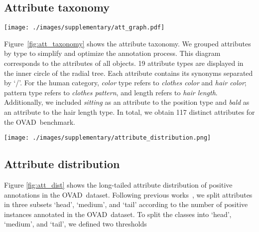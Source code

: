 \documentclass[10pt,twocolumn,letterpaper]{article}
\newcommand{\datasetname}{OVAD}
\begin{document}
\subsection{Attribute taxonomy}
\begin{figure*}[t]
\texttt{[image: ./images/supplementary/att\_graph.pdf]}
\centering
\caption{The figure shows the taxonomy of attribute categories as a radial tree. The 117 attribute categories are divided into 19 attribute types, shown in the first circle. Certain attribute types are repeated for the human category, where the color includes hair color and clothes color. Similarly, pattern refers to clothes pattern, length refers to hair length, and tone refers to hair tone. }
\label{fig:att_taxonomy}
\end{figure*} Figure~\ref{fig:att_taxonomy} shows the attribute taxonomy. We grouped attributes by type to simplify and optimize the annotation process. This diagram corresponds to the attributes of all objects. 19 attribute types are displayed in the inner circle of the radial tree. Each attribute contains its synonyms separated by `/'. For the human category, \textit{color} type refers to \textit{clothes color} and \textit{hair color}; pattern type refers to \textit{clothes pattern}, and length refers to \textit{hair length}. Additionally, we included \textit{sitting} as an attribute to the position type and \textit{bald} as an attribute to the hair length type. In total, we obtain 117 distinct attributes for the \datasetname\ benchmark.
\begin{figure*}[t]
\texttt{[image: ./images/supplementary/attribute\_distribution.png]}
\centering
\caption{The figure shows the attribute frequency distribution in the \datasetname\ benchmark. Bar colors correspond to the frequency-defined subsets \textit{head}, \textit{medium} and \textit{tail}. }
\label{fig:att_dist}
\end{figure*} 
\subsection{Attribute distribution}
Figure \ref{fig:att_dist} shows the long-tailed attribute distribution of positive annotations in the \datasetname\ dataset. Following previous works~\cite{lvis, vaw}, we split attributes in three subsets `head', `medium', and `tail' according to the number of positive instances annotated in the \datasetname\ dataset. To split the classes into `head', `medium', and `tail', we defined two thresholds 
\end{document}
